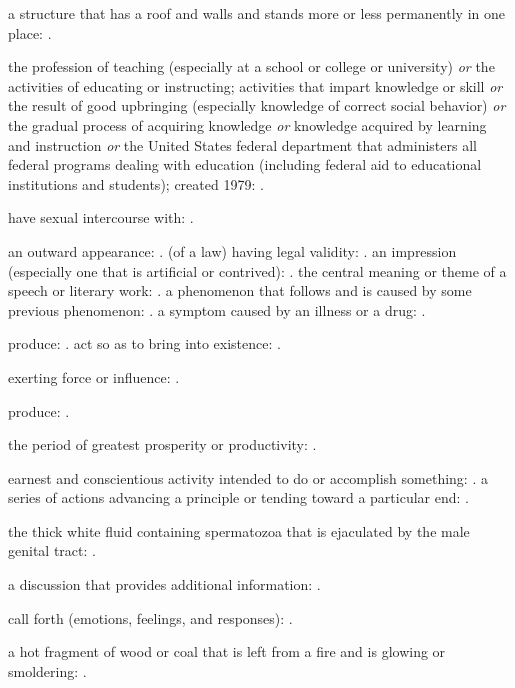   a structure that has a roof and walls and stands more or less permanently in one place: .

  the profession of teaching (especially at a school or college or university) \textit{or} the activities of educating or instructing; activities that impart knowledge or skill \textit{or} the result of good upbringing (especially knowledge of correct social behavior) \textit{or} the gradual process of acquiring knowledge \textit{or} knowledge acquired by learning and instruction \textit{or} the United States federal department that administers all federal programs dealing with education (including federal aid to educational institutions and students); created 1979: .

  have sexual intercourse with: .

  an outward appearance: . (of a law) having legal validity: . an impression (especially one that is artificial or contrived): . the central meaning or theme of a speech or literary work: . a phenomenon that follows and is caused by some previous phenomenon: . a symptom caused by an illness or a drug: .

  produce: . act so as to bring into existence: .

  exerting force or influence: .

  produce: .

  the period of greatest prosperity or productivity: .

  earnest and conscientious activity intended to do or accomplish something: . a series of actions advancing a principle or tending toward a particular end: .

  the thick white fluid containing spermatozoa that is ejaculated by the male genital tract: .

  a discussion that provides additional information: .

  call forth (emotions, feelings, and responses): .

  a hot fragment of wood or coal that is left from a fire and is glowing or smoldering: .

